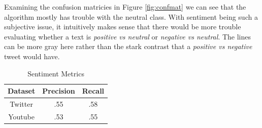 Examining the confusion matricies in Figure \ref{fig:confmat} we can see that the algorithm mostly has trouble with the neutral class. With sentiment being such a subjective issue, it intuitively makes sense that there would be more trouble evaluating whether a text is {\em positive vs neutral} or {\em negative vs neutral}. The lines can be more gray here rather than the stark contrast that a {\em positive vs negative} tweet would have. 

\begin{table}[!ht]
\centering
\begin{tabular}{|c|c|c|} \hline
\textbf{Dataset} & \textbf{Precision} & \textbf{Recall} \\ \hline \hline
Twitter & .55 & .58  \\ \hline
Youtube & .53 & .55 \\ \hline 
\end{tabular}
\caption{Sentiment Metrics}
\label{tab:smetric}
\end{table}


